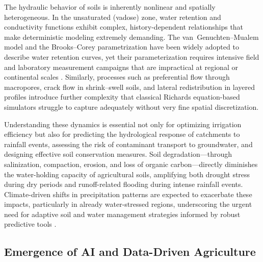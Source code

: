 \documentclass[land,review,accept,pdftex,oneauthor]{Definitions/mdpi}
\begin{document}
The hydraulic behavior of soils is inherently nonlinear and spatially heterogeneous. In the unsaturated (vadose) zone, water retention and conductivity functions exhibit complex, history-dependent relationships that make deterministic modeling extremely demanding. The van~Genuchten--Mualem model and the Brooks--Corey parametrization have been widely adopted to describe water retention curves, yet their parameterization requires intensive field and laboratory measurement campaigns that are impractical at regional or continental scales \citep{vangenuchten1980closed}. Similarly, processes such as preferential flow through macropores, crack flow in shrink--swell soils, and lateral redistribution in layered profiles introduce further complexity that classical Richards equation-based simulators struggle to capture adequately without very fine spatial discretization.

Understanding these dynamics is essential not only for optimizing irrigation efficiency but also for predicting the hydrological response of catchments to rainfall events, assessing the risk of contaminant transport to groundwater, and designing effective soil conservation measures. Soil degradation---through salinization, compaction, erosion, and loss of organic carbon---directly diminishes the water-holding capacity of agricultural soils, amplifying both drought stress during dry periods and runoff-related flooding during intense rainfall events. Climate-driven shifts in precipitation patterns are expected to exacerbate these impacts, particularly in already water-stressed regions, underscoring the urgent need for adaptive soil and water management strategies informed by robust predictive tools \citep{lehmann2020soil}.

\subsection{Emergence of AI and Data-Driven Agriculture}\label{sec1.3}

\end{document}

